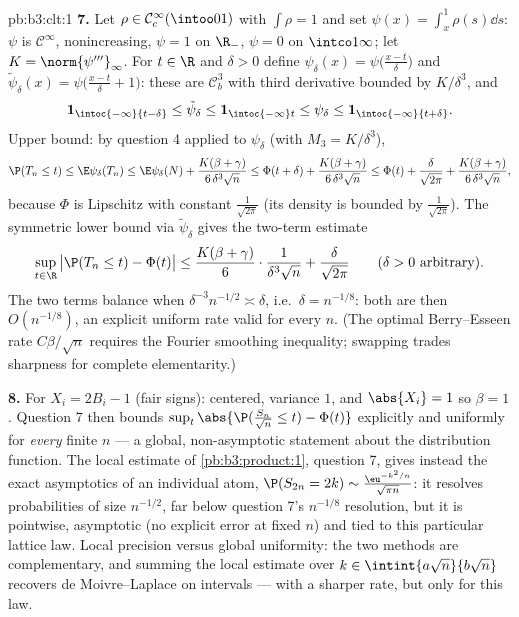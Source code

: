 \begin{solution}{pb:b3:clt:1}
\textbf{7.} Let $\rho \in \mathcal C^\infty_c(\intoo01)$
with $\int\rho = 1$ and set $\psi(x) = \int_x^1\rho(s)\dd
s$: $\psi$ is $\mathcal C^\infty$, nonincreasing, $\psi = 1$
on $\R_-$, $\psi = 0$ on $\intco1\infty$; let $K =
\norm{\psi'''}_\infty$. For $t \in \R$ and $\delta > 0$
define $\psi_\delta(x) = \psi\bigl(\frac{x - t}\delta\bigr)$
and $\tilde\psi_\delta(x) = \psi\bigl(\frac{x - t}\delta +
1\bigr)$: these are $\mathcal C^3_b$ with third derivative
bounded by $K/\delta^3$, and
\[
\mathbf 1_{\intoc{-\infty}{t-\delta}} \leq
\tilde\psi_\delta \leq \mathbf 1_{\intoc{-\infty}t} \leq
\psi_\delta \leq \mathbf 1_{\intoc{-\infty}{t+\delta}} .
\]
Upper bound: by question 4 applied to $\psi_\delta$ (with
$M_3 = K/\delta^3$),
\[
\P(T_n \leq t) \leq \E\psi_\delta(T_n) \leq
\E\psi_\delta(N) + \frac{K(\beta +
\gamma)}{6\,\delta^3\sqrt n}
\leq \Phi(t + \delta) + \frac{K(\beta +
\gamma)}{6\,\delta^3\sqrt n}
\leq \Phi(t) + \frac{\delta}{\sqrt{2\pi}} +
\frac{K(\beta + \gamma)}{6\,\delta^3\sqrt n},
\]
because $\Phi$ is Lipschitz with constant
$\frac1{\sqrt{2\pi}}$ (its density is bounded by
$\frac1{\sqrt{2\pi}}$). The symmetric lower bound via
$\tilde\psi_\delta$ gives the two-term estimate
\[
\sup_{t\in\R}\,\bigl|\P(T_n \leq t) - \Phi(t)\bigr| \leq
\frac{K(\beta + \gamma)}{6}\cdot\frac{1}{\delta^3\sqrt n} +
\frac{\delta}{\sqrt{2\pi}}
\qquad(\delta > 0\ \text{arbitrary}).
\]
The two terms balance when $\delta^{-3}n^{-1/2} \asymp
\delta$, i.e.\ $\delta = n^{-1/8}$: both are then
$O(n^{-1/8})$, an explicit uniform rate valid for every
$n$. (The optimal Berry--Esseen rate $C\beta/\sqrt n$
requires the Fourier smoothing inequality; swapping trades
sharpness for complete elementarity.)

\textbf{8.} For $X_i = 2B_i - 1$ (fair signs): centered,
variance $1$, and $\abs{X_i} = 1$ so $\beta = 1$. Question 7
then bounds $\sup_t\abs{\P(\frac{S_n}{\sqrt n} \leq t) -
\Phi(t)}$ explicitly and uniformly for \emph{every} finite
$n$ --- a global, non-asymptotic statement about the
distribution function. The local estimate of
\cref{pb:b3:product:1}, question 7, gives instead the exact
asymptotics of an individual atom, $\P(S_{2n} = 2k) \sim
\frac{\eu^{-k^2/n}}{\sqrt{\pi n}}$: it resolves
probabilities of size $n^{-1/2}$, far below question 7's
$n^{-1/8}$ resolution, but it is pointwise, asymptotic
(no explicit error at fixed $n$) and tied to this
particular lattice law. Local precision versus global
uniformity: the two methods are complementary, and summing
the local estimate over $k \in \intint{a\sqrt n}{b\sqrt n}$
recovers de Moivre--Laplace on intervals --- with a sharper
rate, but only for this law.


\end{solution}
